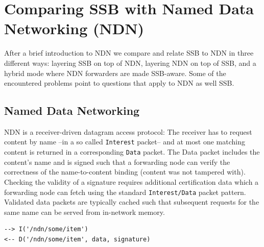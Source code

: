 \documentclass[10pt,sigconf,rewiew]{acmart}
\begin{document}



\section{Comparing SSB with Named Data Networking (NDN)}
\label{sect:NDN}

After a brief introduction to NDN we compare and relate SSB to NDN in
three different ways: layering SSB on top of NDN, layering NDN on top
of SSB, and a hybrid mode where NDN forwarders are made SSB-aware.
Some of the encountered problems point to questions that apply to NDN
as well SSB.

\subsection{Named Data Networking}

NDN is a receiver-driven datagram access protocol: The receiver has to
request content by name --in a so called {\tt Interest} packet-- and
at most one matching content is returned in a corresponding {\tt Data}
packet. The Data packet includes the content's name and is signed such
that a forwarding node can verify the correctness of the
name-to-content binding (content was not tampered with). Checking the validity of a signature requires
additional certification data which a forwarding node can fetch using
the standard {\tt Interest/Data} packet pattern. Validated data
packets are typically cached such that subsequent requests for the
same name can be served from in-network memory.

\begin{verbatim}
--> I('/ndn/some/item')
<-- D('/ndn/some/item', data, signature)
\end{verbatim}
\end{document}
